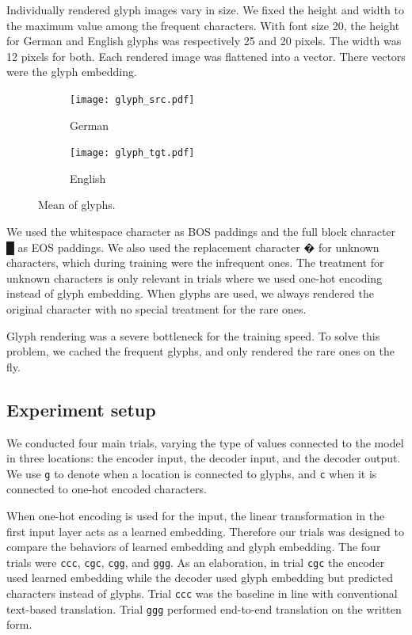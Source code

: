 \documentclass[11pt,twocolumn]{article}
\begin{document}
Individually rendered glyph images vary in size.
We fixed the height and width to the maximum value among the frequent characters.
With font size 20, the height for German and English glyphs was respectively 25 and 20 pixels.
The width was 12 pixels for both.
Each rendered image was flattened into a vector.
There vectors were the glyph embedding.

\begin{figure}
  \centering
  \begin{subfigure}[b]{0.5\linewidth}
    \centering
    \texttt{[image: glyph\_src.pdf]}
    \caption[]{German}
  \end{subfigure}%
  \begin{subfigure}[b]{0.5\linewidth}
    \centering
    \texttt{[image: glyph\_tgt.pdf]}
    \caption[]{English}
  \end{subfigure}
  \caption[]{\label{fig:glyph}Mean of glyphs.}
\end{figure}

We used the whitespace character as BOS paddings and the full block character █ as EOS paddings.
We also used the replacement character � for unknown characters,
which during training were the infrequent ones.
The treatment for unknown characters is only relevant in trials
where we used one-hot encoding instead of glyph embedding.
When glyphs are used, we always rendered the original character
with no special treatment for the rare ones.

Glyph rendering was a severe bottleneck for the training speed.
To solve this problem,
we cached the frequent glyphs,
and only rendered the rare ones on the fly.

\subsection{Experiment setup}\label{sec:experiment-setup}

We conducted four main trials,
varying the type of values connected to the model in three locations:
the encoder input, the decoder input, and the decoder output.
We use \texttt{g} to denote when a location is connected to glyphs,
and \texttt{c} when it is connected to one-hot encoded characters.

When one-hot encoding is used for the input,
the linear transformation in the first input layer acts as a learned embedding.
Therefore our trials was designed to compare the behaviors of learned embedding and glyph embedding.
The four trials were \texttt{ccc}, \texttt{cgc}, \texttt{cgg}, and \texttt{ggg}.
As an elaboration, in trial \texttt{cgc} the encoder used learned embedding
while the decoder used glyph embedding but predicted characters instead of glyphs.
Trial \texttt{ccc} was the baseline in line with conventional text-based translation.
Trial \texttt{ggg} performed end-to-end translation on the written form.
\end{document}
